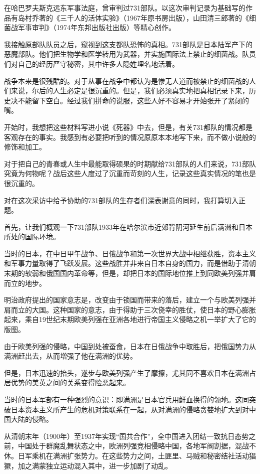 \documentclass[a4paper,12pt,UTF8,twoside]{ctexbook}
\begin{document}
在哈巴罗夫斯克远东军事法庭，曾审判过731部队。以这次审判记录为基础写的作品有岛村乔著的《三千人的活体实验》（1967年原书房出版），山田清三郎著的《细菌战军事审判》（1974年东邦出版社出版）等精心创作。

我接触原部队队员之后，窥视到这支都队恐怖的真相。731部队是日本陆军产下的恶魔部队。他们把生物学和医学转用为武器，并实施国际法上禁止的细菌战。队员们对自己的经历严守秘密，其中许多人隐姓埋名地活着。

战争本来是很残酷的。对于从事在战争中都认为是惨无人道而被禁止的细菌战的人们来说，尔后的人生必定是很沉重的。但是，我们必须真实地把真相记录下来，历史决不能留下空白。经过我们拼命的说服，这些人好不容易才开始张开了紧闭的嘴。

开始时，我想把这些材料写进小说《死器》中去，但是，有关731都队的情况都是客观存在的事实。我感到有必要把听到的情况原原本本地写下来，而不做小说般的修饰和加工。

对于把自己的青春或人生中最能取得硕果的时期献给731部队的人们来说，731部队究竟为何物呢？战后这些人度过了沉重而苛刻的人生，记录这些真实情况的笔也是很沉重的。

对在这次采访中给予协助的731部队的生存者们深表谢意的同时，我打算切入正题。

首先，让我们概观一下731部队1933年在哈尔滨市近郊背阴河延生前后满洲和日本所处的国际环境。

当时的日本，在中日甲午战争、日俄战争和第一次世界大战中相继获胜，资本主义和军事力量取得了飞跃发展。这些战胜并非来自日本自身的国力，而是借助于清朝末期的软弱和俄国国内革命等，但是，却把日本的国际地位推上到同欧美列强并肩而立的地步。

明治政府提出的国家意志是，改变由于锁国而带来的落后，建立一个与欧美列强并肩而立的大国。这种国家的意志，由于得助于三次侥幸的胜仗，使日本的野心膨胀起来，乘自19世纪末期欧美列强在亚洲各地进行帝国主义侵略之机一举扩大了它的版图。

由于欧美列强的侵略，中国到处被蚕食，日本在日俄战争中取胜后，把俄国势力从满洲赶出去，从而増强了他在满洲的优势。

但是，日本迅速的抬头，遂步与欧美列强产生了摩擦，尤其同不喜欢日本在满洲占居优势的美英之间的关系变得险恶起来。

当时的日本军部有一种强烈的意识：即满洲是日本官兵用鲜血换得的领地。这同突破日本资本主义所产生的危机对策联系在一起，从对满洲的侵略贪婪地扩大到对中国大陆的侵略。

从清朝末年（1900年）至1937年实现“国共合作”，全中国进入团结一致抗日态势之前，中国处于群魔乱舞状态之中，欧洲列强竞相侵略中国，各地军阀割据，混战不休。日军乘机在满洲扩张势力。在这些势力之间，土匪里、马贼和秘密结社活动猖獗，加之满蒙独立运动混入其中，进一步加剧了动乱。
\end{document}
